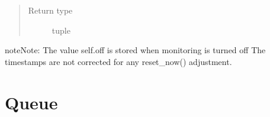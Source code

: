\documentclass[letterpaper,10pt,english]{sphinxmanual}
\begin{document}
\begin{fulllineitems}
\begin{fulllineitems}
\begin{quote}
\begin{description}
\item[{Return type}] \leavevmode
tuple

\end{description}\end{quote}

\begin{sphinxadmonition}{note}{Note:}
The value self.off is stored when monitoring is turned off 
The timestamps are not corrected for any reset\_now() adjustment.
\end{sphinxadmonition}

\end{fulllineitems}


\end{fulllineitems}



\section{Queue}
\label{\detokenize{Reference:queue}}
\end{document}
